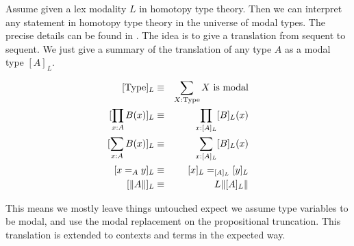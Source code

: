 Assume given a lex modality $L$ in homotopy type theory. Then we can interpret any statement in homotopy type theory in the universe of modal types. The precise details can be found in . The idea is to give a translation from sequent to sequent. We just give a summary of the translation of any type $A$ as a modal type $[A]_L$.

\begin{eqnarray}
{[\mathrm{Type}]_L} &\equiv& \sum_{X:\mathrm{Type}} X\ \mathrm{is\ modal}\\
{[\prod_{x:A}B(x)]_L} &\equiv& \prod_{x:[A]_L}[B]_L(x)\\
{[\sum_{x:A}B(x)]_L} &\equiv& \sum_{x:[A]_L}[B]_L(x)\\
{[x=_Ay]_L} &\equiv& [x]_L=_{[A]_L}[y]_L\\
{[\propTrunc{A}]_L} &\equiv& L\propTrunc{[A]_L}
\end{eqnarray}

This means we mostly leave things untouched expect we assume type variables to be modal, and use the modal replacement on the propositional truncation. This translation is extended to contexts and terms in the expected way.





